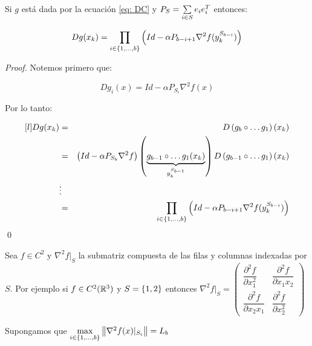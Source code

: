 \begin{lemma}
	Si $g$ est\'a dada por la ecuaci\'on \ref{eq: DC} y $P_S = \sum\limits_{i \in S}{e_ie_i^T}$ entonces:
	
	\begin{equation}
	\label{eq: Diferencial de DC}
	Dg(x_{k}) = \prod\limits_{i \in \left\lbrace1, \dots, b\right\rbrace}{\left(Id - \alpha P_{b-i+1}\nabla ^2 f(y_{k}^{S_{b-i}})\right)}
	\end{equation}
	
\end{lemma}

\begin{proof}
	Notemos primero que:
	
	\begin{equation*}
	Dg_{i}(x) = Id - \alpha P_{S_i} \nabla ^2 f(x)
	\end{equation*}
	
	Por lo tanto:
	
	\begin{equation*}
	\begin{aligned}[l]
	Dg(x_k) & = & D\parenthesis{g_b \circ \dots g_1}(x_k) \\
	& = & \parenthesis{Id - \alpha P_{S_b}\nabla^2f}\parenthesis{\underbrace{g_{b-1} \circ \dots g_{1}(x_k)}_{y_{k}^{S_{b-1}}}} D\parenthesis{g_{b-1} \circ \dots g_1}(x_k) \\
	& \vdots & \\
	& = & \Bigprod{i \in \sett{1, \dots, b}}{\parenthesis{Id - \alpha P_{b-i+1}\nabla ^2 f(y_{k}^{S_{b-i}})}}
	\end{aligned}
	\end{equation*}\qed
	
\end{proof}

\begin{hyp}
	\label{Hipotesis 2}
	Sea $f \in C^2$ y $\nabla^2 f \vert_S$ la submatriz compuesta de las filas y columnas indexadas por $S$. Por ejemplo si $f \in C^2({\mathbb{R}}^3)$ y $S = \left\lbrace1,2\right\rbrace$ entonces $\nabla^2 f \vert_S = \left(\begin{array}{cc}
	\dfrac{\partial^2 f}{\partial x_1 ^2} & \dfrac{\partial^2 f}{\partial x_1 x_2} \\
	\dfrac{\partial^2 f}{\partial x_2 x_1} & \dfrac{\partial^2 f}{\partial x_2 ^2}
	\end{array}\right)$
	
	Supongamos que $\max\limits_{i \in \left\lbrace1, \dots, b\right\rbrace}{\left\lVert\nabla ^2 f(x) \vert_{S_i}\right\rVert} = L_b$
\end{hyp}

